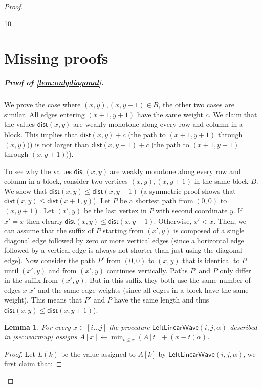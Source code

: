 \documentclass[10pt,a4paper]{article}
\newtheorem{lemma}[theorem]{Lemma}
\newcommand{\LLW}{\mathsf{LeftLinearWave}}
\newcommand{\assign}{\leftarrow}
\newcommand{\dist}{\mathsf{dist}}
\newcommand{\para}[1]{\vspace{-0.1in} \subparagraph*{#1}}
\begin{document}
\begin{proof}
\begin{thebibliography}{10}
\end{thebibliography}


\appendix
\section{Missing proofs}\label{sec:appendix}

\para{Proof of 
\cref{lem:onlydiagonal}.}
We prove the case where $(x,y),(x,y+1) \in B$, the other two cases are similar.  
All edges entering $(x+1,y+1)$ have the same weight $c$. 
We claim that the values $\dist(x,y)$ are weakly monotone along every row and column in a block.
This implies that $\dist(x,y)+c$ (the path to $(x+1,y+1)$ through $(x,y))$) is not larger than $\dist(x,y+1)+c$ (the path to $(x+1,y+1)$ through $(x,y+1))$).  

To see why the values $\dist(x,y)$ are weakly monotone along every row and column in a block, consider two vertices $(x,y),(x,y+1)$ in the same block $B$. We show that $\dist(x,y) \le  \dist(x,y+1)$ (a  symmetric proof shows that $\dist(x,y) \le  \dist(x+1,y)$).
Let $P$ be a shortest path from $(0,0)$ to $(x,y+1)$. 
Let $(x',y)$ be the last vertex in $P$ with second coordinate $y$. 
If $x'=x$ then clearly $\dist(x,y) \le \dist(x,y+1)$. Otherwise, $x' < x$. 
Then, we can assume that the suffix of $P$ starting from $(x',y)$ is composed of a single diagonal edge followed by zero or more vertical edges (since a horizontal edge followed by a vertical edge is always not shorter than just using the diagonal edge). 
Now consider the path $P'$ from $(0,0)$ to $(x,y)$ that is identical to $P$ until $(x',y)$ and from $(x',y)$ continues vertically. Paths $P'$ and $P$ only differ in the suffix from $(x',y)$. But in this suffix they both use the same number of edges $x$-$x'$ and the same edge weights (since all edges in a block have the same weight). 
This means that $P'$ and $P$ have the same length and thus $\dist(x,y) \le \dist(x,y+1)$).      

\begin{lemma}\label{lem:ray}
For every $x\in [i\ldots j]$ the procedure $\LLW(i,j,\alpha)$ described in \cref{sec:warmup} assigns  $A[x]\assign \min_{t\le x}(A[t] + (x-t)\alpha)$.
\end{lemma}
\begin{proof}
Let $L(k)$ be the value assigned to $A[k]$ by $\LLW(i,j,\alpha)$, we first claim that: 


\end{proof}
\end{proof}
\end{document}
